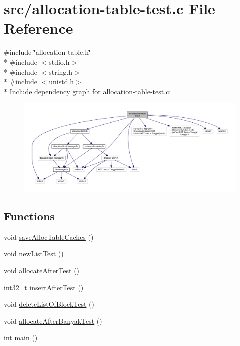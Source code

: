 \hypertarget{allocation-table-test_8c}{\section{src/allocation-\/table-\/test.c File Reference}
\label{allocation-table-test_8c}
}
{\ttfamily \#include \char`\"{}allocation-\/table.\-h\char`\"{}}\\*
{\ttfamily \#include $<$stdio.\-h$>$}\\*
{\ttfamily \#include $<$string.\-h$>$}\\*
{\ttfamily \#include $<$unistd.\-h$>$}\\*
Include dependency graph for allocation-\/table-\/test.c\-:
\nopagebreak
\begin{figure}[H]
\begin{center}
\leavevmode
\includegraphics[width=350pt]{allocation-table-test_8c__incl}
\end{center}
\end{figure}
\subsection*{Functions}
\begin{DoxyCompactItemize}
\item 
void \hyperlink{allocation-table-test_8c_a20af25d3b441d1f25e4830ee2173480c}{save\-Alloc\-Table\-Caches} ()
\item 
void \hyperlink{allocation-table-test_8c_ae0bde2314239fb8dbf38c13fee0a68fe}{new\-List\-Test} ()
\item 
void \hyperlink{allocation-table-test_8c_a57b7cb9823d22ea55528c91e219b7dae}{allocate\-After\-Test} ()
\item 
int32\-\_\-t \hyperlink{allocation-table-test_8c_ae8700eb5d460019b20c7bdf4d0b5880b}{insert\-After\-Test} ()
\item 
void \hyperlink{allocation-table-test_8c_ace8f7db6e87db1e1e06efbc9437e58f1}{delete\-List\-Of\-Block\-Test} ()
\item 
void \hyperlink{allocation-table-test_8c_a9126bcf052408b8d8f30110d1a6c7627}{allocate\-After\-Banyak\-Test} ()
\item 
int \hyperlink{allocation-table-test_8c_ae66f6b31b5ad750f1fe042a706a4e3d4}{main} ()
\end{DoxyCompactItemize}
